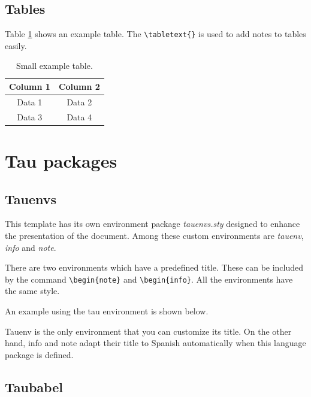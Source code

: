 \documentclass[9pt,a4paper,twoside]{tau-class/tau}
\begin{document}
    \subsection{Tables}
	
        Table \ref{tab:table} shows an example table. The \verb|\tabletext{}| is used to add notes to tables easily. 

		
	\begin{table}[H]
		\centering
		\caption{Small example table.}
		\label{tab:table}
		\begin{tabular}{cc}
			\toprule
			\textbf{Column 1} & \textbf{Column 2} \\
			\midrule
			Data 1 & Data 2 \\
			Data 3 & Data 4 \\
			\bottomrule
		\end{tabular}
			
			
	\end{table}
		
\section{Tau packages}

    \subsection{Tauenvs}
	
        This template has its own environment package \textit{tauenvs.sty} designed to enhance the presentation of the document. Among these custom environments are \textit{tauenv}, \textit{info} and \textit{note}.
		
        There are two environments which have a predefined title. These can be included by the command \verb|\begin{note}| and \verb|\begin{info}|. All the environments have the same style.
			
        An example using the tau environment is shown below.
		
		
        Tauenv is the only environment that you can customize its title. On the other hand, info and note adapt their title to Spanish automatically when this language package is defined.
		
    \subsection{Taubabel}
\end{document}
